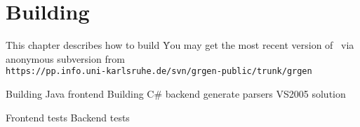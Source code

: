 \chapter{Building \GrG}
\label{chapbuild}

This chapter describes how to build \GrG\.
You may get the most recent version of \GrG\ via anonymous subversion from\\
\texttt{https://pp.info.uni-karlsruhe.de/svn/grgen-public/trunk/grgen}

Building Java frontend
Building C\# backend
generate parsers
VS2005 solution

Frontend tests
Backend tests
